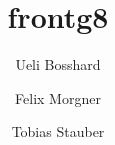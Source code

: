 \documentclass[a4paper,titlepage,twoside]{scrartcl}
\title{frontg8}
\author{Ueli Bosshard}
\author{Felix Morgner}
\author{Tobias Stauber}
\affil{University of Applied Sciences Rapperswil HSR}
\date{}
\newcommand{\fgpsource}{../external/frontg8proto}
\begin{document}
\maketitle



\tableofcontents
\newpage{}

\inputminted{protobuf}{\fgpsource/base.proto}
\end{document}
